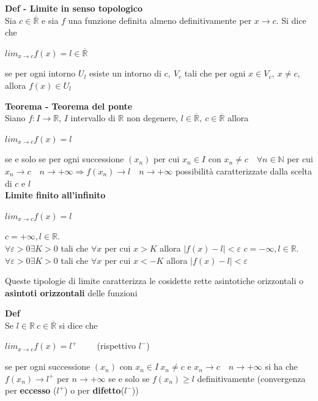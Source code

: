 \documentclass[12pt, a4paper]{article}
\begin{document}
    \textbf{Def - Limite in senso topologico}\\Sia $c\in\overline{\mathbb{R}}$ e sia $f$ una funzione
    definita almeno definitivamente per $x\to c$. Si dice che
    \begin{center}
        $lim_{x\to c}f(x)=l\in\overline{\mathbb{R}}$
    \end{center}
    se per ogni intorno $U_{l}$ esiste un intorno di $c,\ V_{c}$ tali che per ogni $x\in V_{c},\ x\neq c$,
    allora $f(x)\in U_{l}$

    \textbf{Teorema - Teorema del ponte}\\Siano $f:I\to\mathbb{R}$, $I$ intervallo di $\mathbb{R}$ non
    degenere, $l\in\overline{\mathbb{R}},\ c\in\overline{\mathbb{R}}$ allora
    \begin{center}
        $lim_{x\to c}f(x)=l$
    \end{center}
    se e solo se per ogni successione $(x_{n})$ per cui $x_{n}\in I$ con $x_{n}\neq c\quad\forall n\in
\mathbb{N}$ per cui $x_{n}\to c\quad n\to+\infty\Rightarrow f(x_{n})\to l\quad n\to+\infty$
     possibilità caratterizzate dalla scelta di $c$ e $l$\\
    \textbf{Limite finito all'infinito}
    \begin{center}
        $lim_{x\to c}f(x)=l$
    \end{center}
    \subitem $c=+\infty, l\in\mathbb{R}$.\\$\forall\varepsilon>0 \exists K>0$ tali che $\forall x$ per
cui $x>K$ allora $|f(x)-l|<\varepsilon$
\subitem $c=-\infty, l\in\mathbb{R}$.\\$\forall\varepsilon>0 \exists K>0$ tali che $\forall x$ per
    cui $x<-K$ allora $|f(x)-l|<\varepsilon$

    Queste tipologie di limite caratterizza le cosidette rette asintotiche orizzontali o
    \textbf{asintoti orizzontali} delle funzioni

    \textbf{Def}\\Se $l\in\mathbb{R}\ c\in\overline{\mathbb{R}}$ si dice che
    \begin{center}
        $lim_{x\to c}f(x)=l^{+}\qquad$ (rispettivo $l^{-}$)
    \end{center}
    se per ogni successione $(x_{n})$ con $x_{n}\in I\ x_{n}\neq c$ e $x_{n}\to c\quad n\to+\infty$
    si ha che $f(x_{n})\to l^{+}$ per $n\to+\infty$ se e solo se $f(x_{n})\geq l$ definitivamente
    (convergenza per \textbf{eccesso} ($l^{+}$) o per \textbf{difetto}($l^{-}$))
\end{document}
